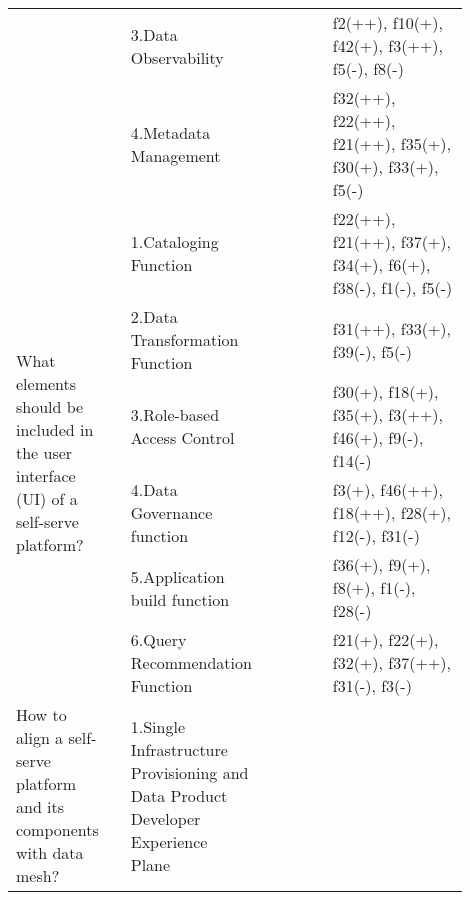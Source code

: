 \begin{tabular}{|p{0.12\linewidth}|p{0.015\linewidth}|p{0.3\linewidth}|p{0.15\linewidth}|p{0.31\linewidth}|}
 & \cellcolor{emerald_shape_7}{} & 3.Data Observability&\cellcolor{emerald_shape_5}{s3, s4, s9, s10, s13, s14, s16, s17, s18, s21, s31, s32, s36, s39, s40, p4, p6} & f2(++), f10(+), f42(+), f3(++), f5(-), f8(-)\\
 & \multirow{-4}{\linewidth}{ \cellcolor{emerald_shape_7}{39}} &4.Metadata Management&\cellcolor{emerald_shape_4}{s9, s10, s16, s17, s22, s30, s34, s43} & f32(++), f22(++), f21(++), f35(+), f30(+), f33(+), f5(-)\\
\multirow{6}{\linewidth}{What elements should be included in the user interface (UI) of a self-serve platform?} &\cellcolor{emerald_shape_7}{} &1.Cataloging Function&\cellcolor{emerald_shape_6}{s1, s3, s9, s10, s13, s14, s15, s16, s17, s18, s21, s24, s27, s28, s29, s30, s32, s33, s35, s36, s37, s38, s42, s43, p1, p2, p4, p5, p6} & f22(++), f21(++), f37(+), f34(+), f6(+), f38(-), f1(-), f5(-)\\
 & \cellcolor{emerald_shape_7}{} & 2.Data Transformation Function&\cellcolor{emerald_shape_6}{s5, s6, s11, s12, s13, s16, s17, s18, s26, s27, s28, s30, s31, s33, s35, s37, s38, s40, s41, s42, s43, p1, p5} & f31(++), f33(+), f39(-), f5(-)\\
 & \cellcolor{emerald_shape_7}{} & 3.Role-based Access Control&\cellcolor{emerald_shape_6}{s2, s3, s5, s8, s9, s11, s13, s15, s16, s17, s26, s27, s28, s29, s31, s32, s33, s35, s42, s43, p1, p3, p4} & f30(+), f18(+), f35(+), f3(++), f46(+), f9(-), f14(-)\\
 & \cellcolor{emerald_shape_7}{} & 4.Data Governance function&\cellcolor{emerald_shape_6}{s1, s2, s4, s6, s7, s12, s14, s15, s16, s17, s21, s24, s25, s27, s28, s29, s30, s31, s32, s34, s36, s37, s38, s39, s40, s41, s42, s43, p6} & f3(+), f46(++), f18(++), f28(+), f12(-), f31(-)\\
 & \cellcolor{emerald_shape_7}{} & 5.Application build function&\cellcolor{emerald_shape_3}{s4, s10, s12, s17, s22, s26, s29, s33, s39} & f36(+), f9(+), f8(+), f1(-), f28(-)\\
 & \multirow{-6}{\linewidth}{ \cellcolor{emerald_shape_7}{46}} &6.Query Recommendation Function&\cellcolor{emerald_shape_3}{s3, s5, s11, s13, s16, s27, s32, s33, s34} & f21(+), f22(+), f32(+), f37(++), f31(-), f3(-)\\
\multirow{5}{\linewidth}{ How to align a self-serve platform and its components with data mesh?} &\cellcolor{emerald_shape_3}{} &1.Single Infrastructure Provisioning and Data Product Developer Experience Plane&\cellcolor{emerald_shape_3}{s1} & \\

\end{tabular}
